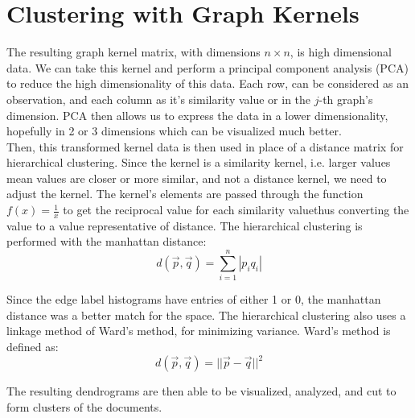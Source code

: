%
%
%

\section{Clustering with Graph Kernels}

\hspace*{0.3cm} The resulting graph kernel matrix, with dimensions $n \times n$, is high dimensional data. We can take this kernel and perform a principal component analysis (PCA) to reduce the high dimensionality of this data. Each row, can be considered as an observation, and each column as it's similarity value or in the $j$-th graph's dimension. PCA then allows us to express the data in a lower dimensionality, hopefully in 2 or 3 dimensions which can be visualized much better. \\
Then, this transformed kernel data is then used in place of a distance matrix for hierarchical clustering. Since the kernel is a similarity kernel, i.e. larger values mean values are closer or more similar, and not a distance kernel, we need to adjust the kernel. The kernel's elements are passed through the function $f(x) = \frac{1}{x}$ to get the reciprocal value for each similarity value\textemdash thus converting the value to a value representative of distance. The hierarchical clustering is performed with the manhattan distance: \\

\begin{equation}
d(\vec{p},\vec{q}) = \sum_{i=1}^n |p_i q_i|
\end{equation}

Since the edge label histograms have entries of either 1 or 0, the manhattan distance was a better match for the space. The hierarchical clustering also uses a linkage method of Ward's method, for minimizing variance. Ward's method is defined as:\\

\begin{equation}
d(\vec{p},\vec{q}) = || \vec{p} - \vec{q} ||^2
\end{equation}

The resulting dendrograms are then able to be visualized, analyzed, and cut to form clusters of the documents. 